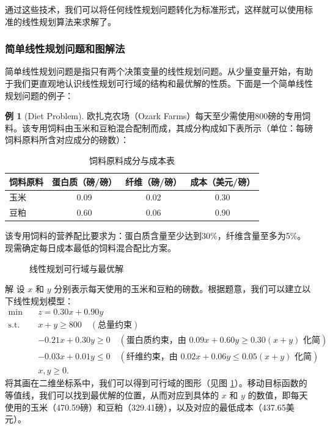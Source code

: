 \documentclass[12pt]{article}
\theoremstyle{plain}
\theoremstyle{definition}
\newtheorem{exm}{例}[subsection]
\newenvironment{slv}[1][解]{\begin{paragraph}{#1}\mbox{}}{\end{paragraph}\par\nopagebreak}
\newcommand{\st}{\mathrel{\text{s.t.}}}
\begin{document}
通过这些技术，我们可以将任何线性规划问题转化为标准形式，这样就可以使用标准的线性规划算法来求解了。

\subsubsection{简单线性规划问题和图解法}\label{subsubsec:simple_lp}

简单线性规划问题是指只有两个决策变量的线性规划问题。从少量变量开始，有助于我们更直观地认识线性规划可行域的结构和最优解的性质。下面是一个简单线性规划问题的例子：

\begin{exm}[Diet Problem]
    欧扎克农场（Ozark Farms）每天至少需使用800磅的专用饲料。该专用饲料由玉米和豆粕混合配制而成，其成分构成如下表所示（单位：每磅饲料原料所含对应成分的磅数）：

    \begin{table}[!htbp]
    \centering
    \caption{饲料原料成分与成本表}
    \begin{tabular}{lccc}
        \toprule
        饲料原料   & 蛋白质（磅/磅） & 纤维（磅/磅） & 成本（美元/磅） \\
        \midrule
        玉米 & 0.09 & 0.02 & 0.30 \\
        豆粕 & 0.60 & 0.06 & 0.90 \\
        \bottomrule
    \end{tabular}
    \end{table}
    该专用饲料的营养配比要求为：蛋白质含量至少达到30\%，纤维含量至多为5\%。现需确定每日成本最低的饲料混合配比方案。

    \begin{figure}[!htbp]
        \centering
        \caption{线性规划可行域与最优解}
        \label{fig:feasible_region}
    \end{figure}
    \begin{slv}
    设 $x$ 和 $y$ 分别表示每天使用的玉米和豆粕的磅数。根据题意，我们可以建立以下线性规划模型：
    \begin{align*}
        \min \quad & z = 0.30x + 0.90y \\
        \st \quad & x + y \geq 800 \quad (\text{总量约束}) \\
        & -0.21x + 0.30y \geq 0 \quad (\text{蛋白质约束，由 } 0.09x + 0.60y \geq 0.30(x + y) \text{ 化简}) \\
        & -0.03x + 0.01y \leq 0 \quad (\text{纤维约束，由 } 0.02x + 0.06y \leq 0.05(x + y) \text{ 化简}) \\
        & x, y \geq 0.
    \end{align*}
    将其画在二维坐标系中，我们可以得到可行域的图形（见图 \ref{fig:feasible_region}）。移动目标函数的等值线，我们可以找到最优解的位置，从而对应到具体的 $x$ 和 $y$ 的数值，即每天使用的玉米（470.59磅）和豆粕（329.41磅），以及对应的最低成本（437.65美元）。
    \end{slv}
\end{exm}
\end{document}
